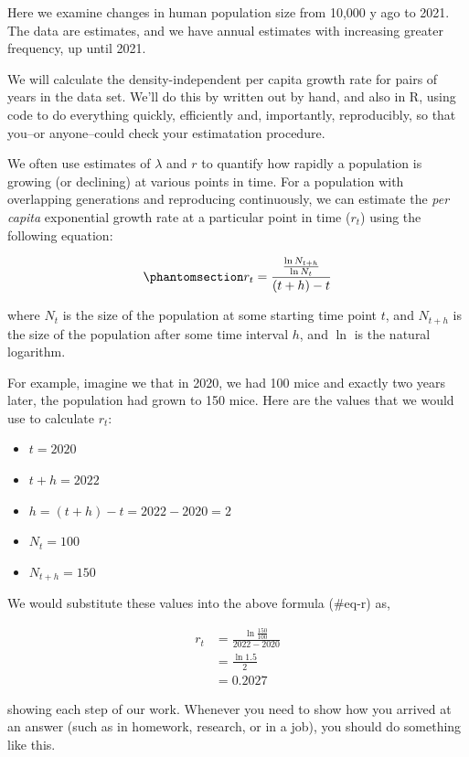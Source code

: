 \documentclass[
  letterpaper,
  DIV=11,
  numbers=noendperiod]{scrreprt}
\providecommand{\tightlist}{%
  \setlength{\itemsep}{0pt}\setlength{\parskip}{0pt}}
\begin{document}
Here we examine changes in human population size from 10,000 y ago to
2021. The data are estimates, and we have annual estimates with
increasing greater frequency, up until 2021.

We will calculate the density-independent per capita growth rate for
pairs of years in the data set. We'll do this by written out by hand,
and also in R, using code to do everything quickly, efficiently and,
importantly, reproducibly, so that you--or anyone--could check your
estimatation procedure.

We often use estimates of \(\lambda\) and \(r\) to quantify how rapidly
a population is growing (or declining) at various points in time. For a
population with overlapping generations and reproducing continuously, we
can estimate the \emph{per capita} exponential growth rate at a
particular point in time (\(r_t\)) using the following equation:

\begin{equation}\phantomsection\label{eq-r}{r_t = \frac{\frac{\ln N_{t+h}}{\ln N_t}}{(t+h) - t}}\end{equation}

where \(N_t\) is the size of the population at some starting time point
\(t\), and \(N_{t+h}\) is the size of the population after some time
interval \(h\), and \(\ln\) is the natural logarithm.

For example, imagine we that in 2020, we had 100 mice and exactly two
years later, the population had grown to 150 mice. Here are the values
that we would use to calculate \(r_t\):

\begin{itemize}
\tightlist
\item
  \(t = 2020\)
\item
  \(t+h = 2022\)
\item
  \(h = (t+h) - t = 2022-2020 = 2\)
\item
  \(N_t = 100\)
\item
  \(N_{t+h} = 150\)
\end{itemize}

We would substitute these values into the above formula (\#eq-r) as,

\begin{align*}
r_t &= \frac{ \ln \frac{150}{100}}{2022 - 2020}\\
 &=\frac{\ln 1.5}{2}\\
 &= 0.2027
\end{align*}

showing each step of our work. Whenever you need to show how you arrived
at an answer (such as in homework, research, or in a job), you should do
something like this.
\end{document}
